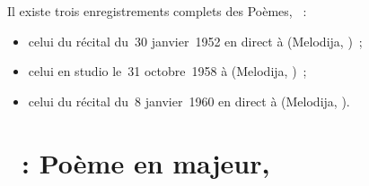 Il existe trois enregistrements complets des Poèmes, ~:
\begin{itemize}
 \item
 celui du récital du~30 janvier~1952 en direct à \LPGH (Melodija, )~;
 \item
 celui en studio le~31 octobre~1958 à \Moscow (Melodija, )~;
 \item
 celui du récital du~8 janvier~1960 en direct à \MCSH (Melodija, ).
\end{itemize}

\section{\ifChrono \Scriabine{}~: \fi
Poème en \kF \Sharp majeur,  }
\label{\thesection}

